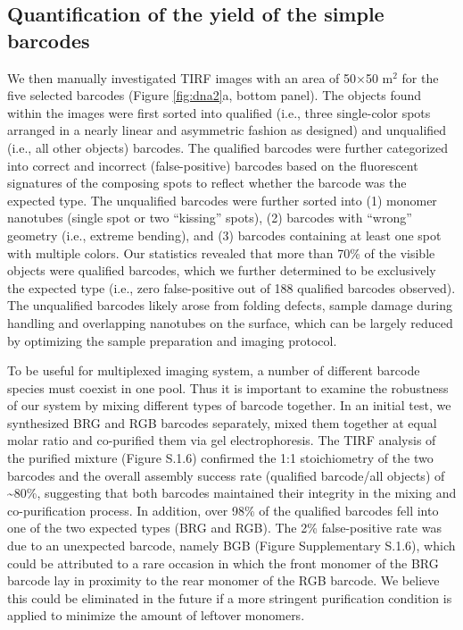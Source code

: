\subsection{Quantification of the yield of the simple barcodes}
We then %
manually investigated TIRF images with an area of 50×50 \textmu m$^2$ for the five selected 
barcodes (Figure \ref{fig:dna2}a, bottom panel). The objects found within the images were first sorted 
into qualified (i.e., three single-color spots arranged in a nearly linear and asymmetric 
fashion as designed) and unqualified (i.e., all other objects) barcodes. The qualified 
barcodes were further categorized into correct and incorrect (false-positive) barcodes 
based on the fluorescent signatures of the composing spots to reflect whether the barcode 
was the expected type. The unqualified barcodes were further sorted into (1) monomer 
nanotubes (single spot or two “kissing” spots), (2) barcodes with “wrong” geometry (i.e., 
extreme bending), and (3) barcodes containing at least one spot with multiple colors. Our 
statistics revealed that more than 70\% of the visible objects were qualified barcodes, 
which we further determined to be exclusively the expected type (i.e., zero false-positive 
out of 188 qualified barcodes observed). The unqualified barcodes likely arose from 
folding defects, sample damage during handling and overlapping nanotubes on the 
surface, which can be largely reduced by optimizing the sample preparation and imaging 
protocol. 

To be useful for multiplexed imaging system, a number of different barcode species must
coexist in one pool. Thus it is important to examine the robustness of our system by 
mixing different types of barcode together. In an initial test, we synthesized BRG and 
RGB barcodes separately, mixed them together at equal molar ratio and co-purified them 
via gel electrophoresis. The TIRF analysis of the purified mixture (Figure S.1.6) confirmed 
the 1:1 stoichiometry of the two barcodes and the overall assembly success rate (qualified 
barcode/all objects) of \textasciitilde80\%, suggesting that both barcodes maintained their integrity in 
the mixing and co-purification process. In addition, over 98\% of the qualified barcodes 
fell into one of the two expected types (BRG and RGB). The 2\% false-positive rate was 
due to an unexpected barcode, namely BGB (Figure Supplementary S.1.6), which could be attributed to a 
rare occasion in which the front monomer of the BRG barcode lay in proximity to the 
rear monomer of the RGB barcode. We believe this could be eliminated in the future if a 
more stringent purification condition is applied to minimize the amount of leftover 
monomers.  


